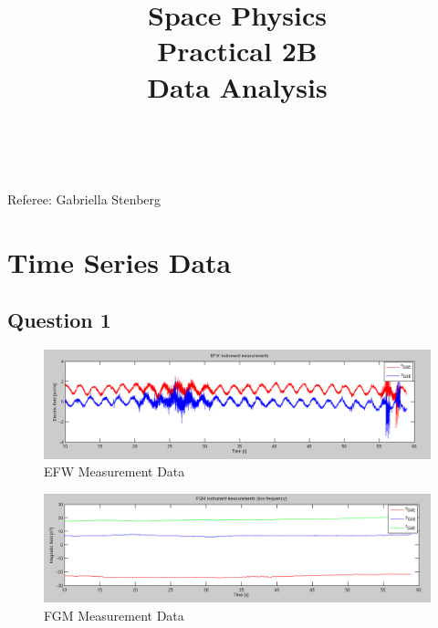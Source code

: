 \documentclass{article}
\title{\textbf {Space Physics} \\ Practical 2B\\ Data Analysis} %
\author{\authorivan\\\authoranu}
\begin{document}
\maketitle %

\centerline{Referee: Gabriella Stenberg}

\setlength\parindent{0pt} %

\renewcommand{\labelenumi}{\alph{enumi}.} %
\clearpage

\tableofcontents

\listoffigures

\clearpage


    

\section{Time Series Data}

\subsection{Question 1}

\begin{figure}[htb]
\centering
\includegraphics[width=\textwidth]{Figures/EFW_measurement.png}
\caption{EFW Measurement Data}
\label{fig:EFW}
\end{figure}

\begin{figure}[htb]
\centering
\includegraphics[width=\textwidth]{Figures/FGM_measurement.png}
\caption{FGM Measurement Data}
\label{fig:FGM}
\end{figure}
\end{document}
